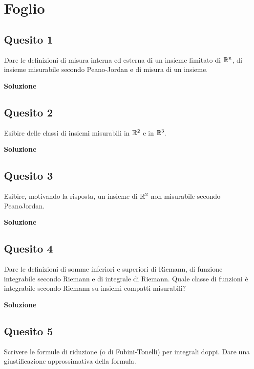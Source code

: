 \chapter{Foglio \ \thechapter}


\section*{Quesito 1}
Dare le definizioni di misura interna ed esterna di un insieme limitato di $\mathbb{R}^n$,
di insieme misurabile secondo Peano-Jordan e di misura di un insieme.

\medskip
\begin{large}
\textbf{Soluzione}
\end{large}


\section*{Quesito 2}
Esibire delle classi di insiemi misurabili in $\mathbb{R}^2$ e in $\mathbb{R}^3$.

\medskip
\begin{large}
\textbf{Soluzione}
\end{large}


\section*{Quesito 3}
Esibire, motivando la risposta, un insieme di $\mathbb{R}^2$ non misurabile secondo PeanoJordan.

\medskip
\begin{large}
\textbf{Soluzione}
\end{large}


\section*{Quesito 4}
Dare le definizioni di somme inferiori e superiori di Riemann, di funzione integrabile secondo Riemann e di integrale di Riemann. Quale classe di funzioni è integrabile
secondo Riemann su insiemi compatti misurabili?

\medskip
\begin{large}
\textbf{Soluzione}
\end{large}


\section*{Quesito 5}
Scrivere le formule di riduzione (o di Fubini-Tonelli) per integrali doppi. Dare
una giustificazione approssimativa della formula.

